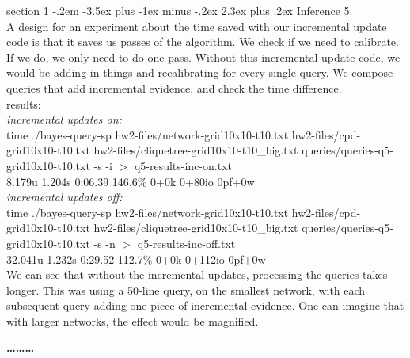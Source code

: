 \documentclass[12pt]{article}
\makeatletter
\newenvironment{problem}{\@startsection
       {section}
       {1}
       {-.2em}
       {-3.5ex plus -1ex minus -.2ex}
       {2.3ex plus .2ex}
       {\pagebreak[3]%
       \large\bf\noindent{Problem }
       }
       }
       {%
       \begin{center}\large\bf \ldots\ldots\ldots\end{center}}
\makeatother
\begin{document}
\begin{problem}{Inference}
5.\\
A design for an experiment about the time saved with our incremental update code is that it saves us passes of the algorithm.  We check if we need to calibrate.  If we do, we only need to do one pass.  Without this incremental update code, we would be adding in things and recalibrating for every single query.  We compose queries that add incremental evidence, and check the time difference.\\
\noindent results:\\
\noindent \textit{incremental updates on:}\\
time ./bayes-query-sp hw2-files/network-grid10x10-t10.txt hw2-files/cpd-grid10x10-t10.txt hw2-files/cliquetree-grid10x10-t10\_big.txt queries/queries-q5-grid10x10-t10.txt -s -i $>$ q5-results-inc-on.txt\\
8.179u 1.204s 0:06.39 146.6\%    0+0k 0+80io 0pf+0w\\
\noindent \textit{incremental updates off:}\\
time ./bayes-query-sp hw2-files/network-grid10x10-t10.txt hw2-files/cpd-grid10x10-t10.txt hw2-files/cliquetree-grid10x10-t10\_big.txt queries/queries-q5-grid10x10-t10.txt -s -n  $>$ q5-results-inc-off.txt\\
32.041u 1.232s 0:29.52 112.7\%   0+0k 0+112io 0pf+0w\\

We can see that without the incremental updates, processing the queries takes longer.  This was using a 50-line query, on the smallest network, with each subsequent query adding one piece of incremental evidence.  One can imagine that with larger networks, the effect would be magnified.

\end{problem}{}
\end{document}
